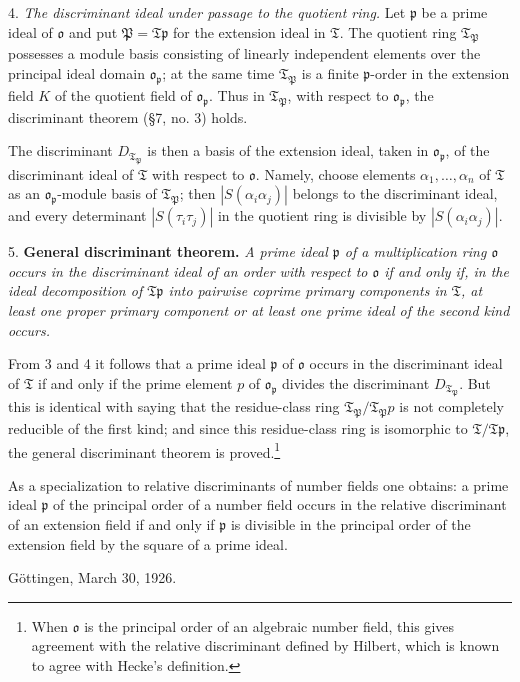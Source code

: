 \documentclass[11pt]{article}
\providecommand{\mT}{\mathfrak{T}}
\providecommand{\mo}{\mathfrak{o}}
\providecommand{\mP}{\mathfrak{P}}
\providecommand{\mpideal}{\mathfrak{p}}
\begin{document}
4. \emph{The discriminant ideal under passage to the quotient ring.} Let $\mpideal$ be a prime ideal of $\mo$ and put $\mP=\mT\mpideal$ for the extension ideal in $\mT$. The quotient ring $\mT_\mP$ possesses a module basis consisting of linearly independent elements over the principal ideal domain $\mo_\mpideal$; at the same time $\mT_\mP$ is a finite $\mpideal$-order in the extension field $K$ of the quotient field of $\mo_\mpideal$. Thus in $\mT_\mP$, with respect to $\mo_\mpideal$, the discriminant theorem (§7, no. 3) holds.

The discriminant $D_{\mT_\mP}$ is then a basis of the extension ideal, taken in $\mo_\mpideal$, of the discriminant ideal of $\mT$ with respect to $\mo$. Namely, choose elements $\alpha_1,\ldots,\alpha_n$ of $\mT$ as an $\mo_\mpideal$-module basis of $\mT_\mP$; then $|S(\alpha_i\alpha_j)|$ belongs to the discriminant ideal, and every determinant $|S(\tau_i\tau_j)|$ in the quotient ring is divisible by $|S(\alpha_i\alpha_j)|$.

5. \textbf{General discriminant theorem.} \emph{A prime ideal $\mpideal$ of a multiplication ring $\mo$ occurs in the discriminant ideal of an order with respect to $\mo$ if and only if, in the ideal decomposition of $\mT\mpideal$ into pairwise coprime primary components in $\mT$, at least one proper primary component or at least one prime ideal of the second kind occurs.}

From 3 and 4 it follows that a prime ideal $\mpideal$ of $\mo$ occurs in the discriminant ideal of $\mT$ if and only if the prime element $p$ of $\mo_\mpideal$ divides the discriminant $D_{\mT_\mP}$. But this is identical with saying that the residue-class ring $\mT_\mP/\mT_\mP p$ is not completely reducible of the first kind; and since this residue-class ring is isomorphic to $\mT/\mT\mpideal$, the general discriminant theorem is proved.\footnote{When $\mo$ is the principal order of an algebraic number field, this gives agreement with the relative discriminant defined by Hilbert, which is known to agree with Hecke's definition.}

As a specialization to relative discriminants of number fields one obtains: a prime ideal $\mpideal$ of the principal order of a number field occurs in the relative discriminant of an extension field if and only if $\mpideal$ is divisible in the principal order of the extension field by the square of a prime ideal.

Göttingen, March 30, 1926.
\end{document}

